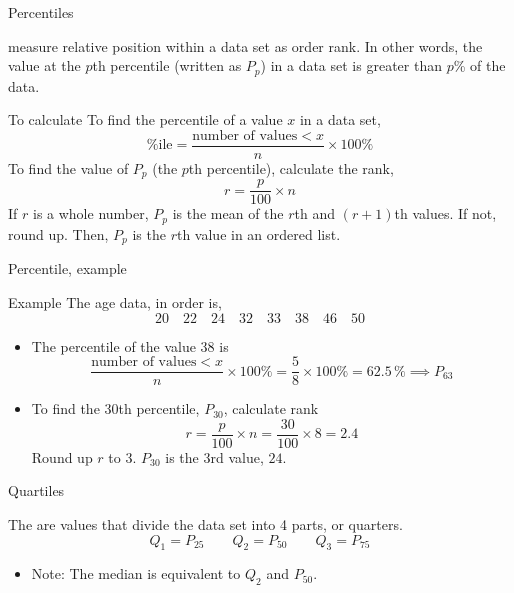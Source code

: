 \documentclass[xcolor=table, handout]{beamer}
\begin{document}
\begin{frame}{Percentiles}
\begin{block}{}
 measure relative position within a data set as order rank. In other words, the value at the $p$th percentile (written as $P_p$) in a data set is greater than $p$\% of the data.
\end{block}

\pause
\begin{exampleblock}{To calculate}
To find the percentile of a value $x$ in a data set,
\[\%\text{ile} = \frac{\text{number of values} < x}{n} \times 100\%\]
\pause
To find the value of $P_p$ (the $p$th percentile), calculate the rank,
\[ r = \frac p {100} \times n\]
If $r$ is a whole number, $P_p$ is the mean of the $r$th and $(r+1)$th values. If not, round up. Then, $P_p$ is the $r$th value in an ordered list.
\end{exampleblock}
\end{frame}

\begin{frame}{Percentile, example}
\begin{exampleblock}{Example}
The age data, in order is, 
\[20 \quad 22 \quad 24 \quad 32 \quad 33 \quad 38 \quad 46 \quad 50 \]

\begin{itemize}
\pause
\item The percentile of the value 38 is
\[\frac{\text{number of values} < x}{n} \times 100\% = \frac{5}{8} \times 100\% = 62.5 \,\% \implies P_{63}\]
\pause
\item To find the 30th percentile, $P_{30}$, calculate rank
\[ r= \frac {p}{100} \times n = \frac {30}{100} \times 8 = 2.4 \]
Round up $r$ to $3$. $P_{30}$ is the 3rd value, $24$.
\end{itemize}
\end{exampleblock}
\end{frame}

\begin{frame}{Quartiles}
\begin{block}{}
The  are values that divide the data set into 4 parts, or quarters.
\[Q_1 = P_{25} \qquad Q_2 = P_{50} \qquad Q_3 = P_{75}\]
\begin{itemize}
\pause
\item Note: The median is equivalent to $Q_2$ and $P_{50}$.
\end{itemize}
\end{block}
\end{frame}
\end{document}
